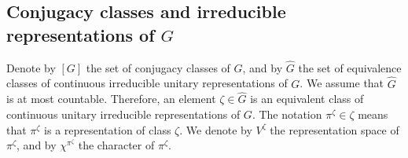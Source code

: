 \documentclass[12pt]{amsart}
\theoremstyle{definition}
\numberwithin{equation}{section}
\begin{document}
\subsection{Conjugacy classes and irreducible representations of $G$}\label{NotSection1.2}
Denote by $\left[G\right]$ the set of conjugacy classes
of $G$, and by $\widehat{G}$ the set of equivalence classes of continuous irreducible
unitary representations of $G$. We assume that $\widehat{G}$ is at most countable.
Therefore, an element $\zeta\in\widehat{G}$ is an equivalent class of continuous unitary irreducible representations of $G$.  The notation $\pi^{\zeta}\in\zeta$ means that $\pi^{\zeta}$ is a representation of class $\zeta$. We denote by $V^{\zeta}$ the representation space
of $\pi^{\zeta}$, and by $\chi^{\pi^\zeta}$ the character of $\pi^{\zeta}$.
\end{document}
